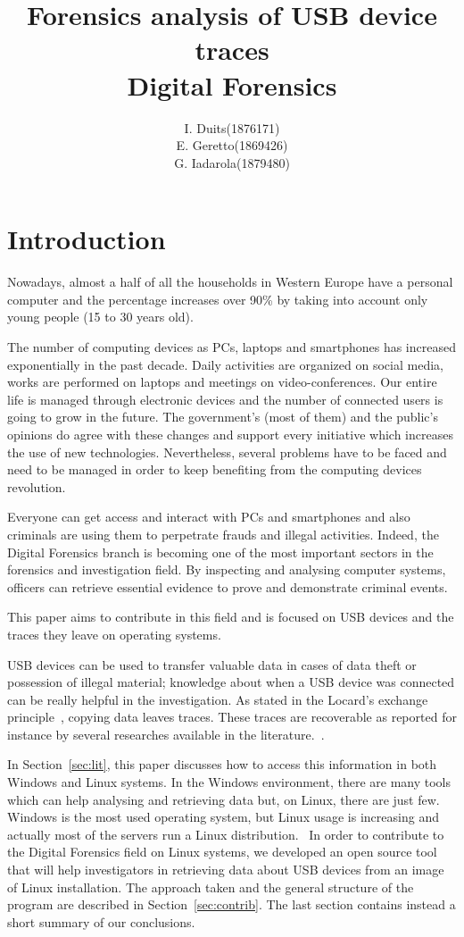\documentclass[a4paper]{article}
\title{Forensics analysis of USB device traces\\
\large Digital Forensics}
\author{
\begin{tabular}{>{\raggedleft}m{5cm}m{5cm}}
I. Duits & (1876171) \\
E. Geretto & (1869426) \\
G. Iadarola & (1879480) \\
\end{tabular}
}
\begin{document}
\maketitle

\section{Introduction}
Nowadays, almost a half of all the households in Western Europe have a personal
computer and the percentage increases over 90\% by taking into account only
young people (15 to 30 years old).

The number of computing devices as PCs, laptops and smartphones has increased
exponentially in the past decade. Daily activities are organized on social
media, works are performed on laptops and meetings on video-conferences. Our
entire life is managed through electronic devices and the number of connected
users is going to grow in the future. The government's (most of them) and the
public's opinions do agree with these changes and support every initiative
which increases the use of new technologies. Nevertheless, several problems have
to be faced and need to be managed in order to keep benefiting from the
computing devices revolution.

Everyone can get access and interact with PCs and smartphones and also criminals
are using them to perpetrate frauds and illegal activities. Indeed, the Digital
Forensics branch is becoming one of the most important sectors in the forensics
and investigation field. By inspecting and analysing computer systems, officers
can retrieve essential evidence to prove and demonstrate criminal events.

This paper aims to contribute in this field and is focused on USB devices and
the traces they leave on operating systems.

USB devices can be used to transfer valuable data in cases of data theft or
possession of illegal material; knowledge about when a USB device was connected
can be really helpful in the investigation. As stated in the Locard's exchange
principle~\cite{locard2008locard}, copying data leaves traces. These traces are
recoverable as reported for instance by several researches available in the
literature.~\cite{Tanushree12,Abhijeet14}.

In Section~\ref{sec:lit}, this paper discusses how to access this information
in both Windows and Linux systems. In the Windows environment, there are many
tools which can help analysing and retrieving data but, on Linux, there are
just few. Windows is the most used operating system, but Linux usage is
increasing and actually most of the servers run a Linux
distribution.~\cite{osShare,InternetServer} In order to contribute to the
Digital Forensics field on Linux systems, we developed an open source tool that
will help investigators in retrieving data about USB devices from an image of
Linux installation. The approach taken and the general structure of the program
are described in Section~\ref{sec:contrib}. The last section contains instead a
short summary of our conclusions.
\end{document}
